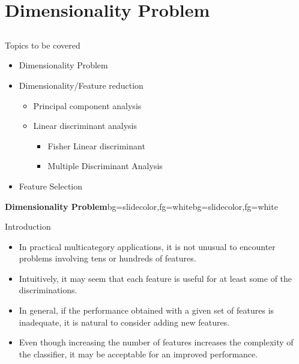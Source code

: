 \section{Dimensionality Problem}
\subsection{}

\begin{frame}{Topics to be covered}
\begin{itemize}
\item Dimensionality Problem
\item Dimensionality/Feature reduction
\begin{itemize}
\item Principal component analysis
\item Linear discriminant analysis
\begin{itemize}
\item Fisher Linear discriminant
\item Multiple Discriminant Analysis
\end{itemize}
\end{itemize}
\item Feature Selection
\end{itemize}
\end{frame}


\begin{frame}{}
\begin{variableblock}{\centering \Large \textbf{\vspace{4pt}\newline Dimensionality Problem\vspace{4pt}}}{bg=slidecolor,fg=white}{bg=slidecolor,fg=white}
\end{variableblock}
\end{frame}


 
\begin{frame}{Introduction}
\begin{itemize}
\item In practical multicategory applications, it is not unusual to encounter problems involving tens or hundreds of features.
\item Intuitively, it may seem that each feature is useful for at least some of the discriminations.
\item In general, if the performance obtained with a given set of features is inadequate, it is natural to consider adding new features.
\item Even though increasing the number of features increases
the complexity of the classifier, it may be acceptable for an
improved performance.
\end{itemize}
\end{frame}

